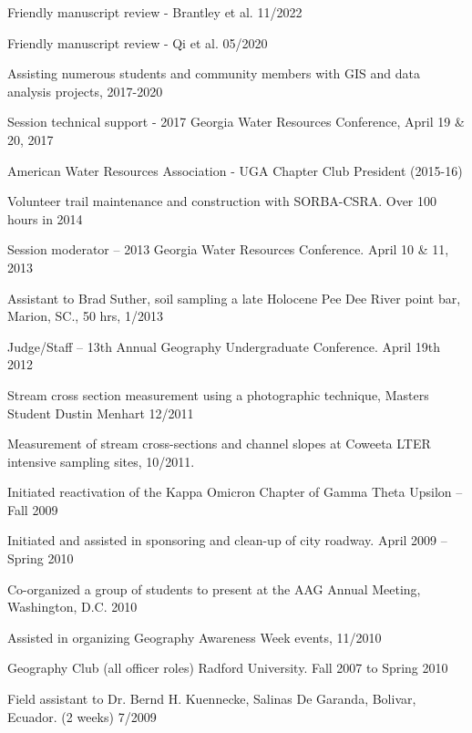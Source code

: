 \documentclass[10pt,letterpaper]{article}
\begin{document}
	\begin{itemize*}
		
		\item
		Friendly manuscript review - Brantley et al. 11/2022
		\item 
		Friendly manuscript review - Qi et al. 05/2020
		\item
		Assisting numerous students and community members with GIS and data analysis projects, 2017-2020
		\item
		Session technical support - 2017 Georgia Water Resources Conference, April 19 \& 20, 2017
		\item
		American Water Resources Association - UGA Chapter Club President (2015-16)
		\item
		Volunteer trail maintenance and construction with SORBA-CSRA. Over 100 hours in 2014
		\item
		Session moderator – 2013 Georgia Water Resources Conference. April 10 \& 11, 2013
		\item
		Assistant to Brad Suther, soil sampling a late Holocene Pee Dee River point bar, Marion, SC., 50 hrs, 1/2013
		\item
		Judge/Staff – 13th Annual Geography Undergraduate Conference. April 19th 2012
		\item
		Stream cross section measurement using a photographic technique, Masters Student Dustin Menhart 12/2011
		\item 
		Measurement of stream cross-sections and channel slopes at Coweeta LTER intensive sampling sites, 10/2011.
		\item 
		Initiated reactivation of the Kappa Omicron Chapter of Gamma Theta Upsilon – Fall 2009
		\item 
		Initiated and assisted in sponsoring and clean-up of city roadway. April 2009 – Spring 2010
		\item 
		Co-organized a group of students to present at the AAG Annual Meeting, Washington, D.C. 2010
		\item 
		Assisted in organizing Geography Awareness Week events, 11/2010
		\item 
		Geography Club (all officer roles) Radford University. Fall 2007 to Spring 2010
		\item 
		Field assistant to Dr. Bernd H. Kuennecke, Salinas De Garanda, Bolivar, Ecuador. (2 weeks) 7/2009
		
		
	\end{itemize*}
	
	
\end{document}

